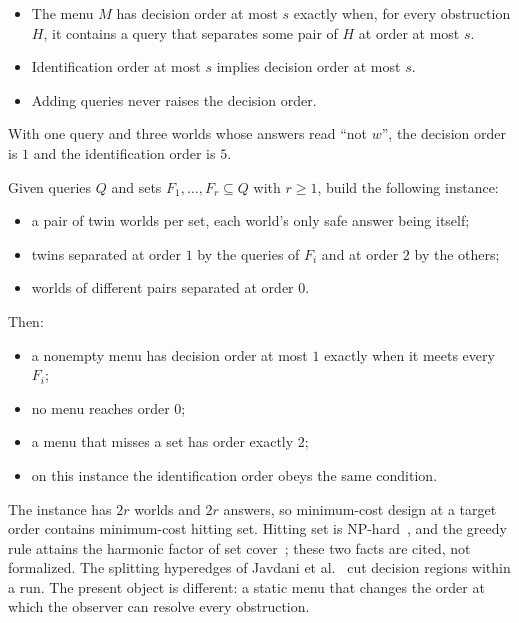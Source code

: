 \begin{theorem}
\label{thm:hitting}
\begin{itemize}
\item The menu $M$ has decision order at most $s$ exactly when, for every obstruction $H$, it
contains a query that separates some pair of $H$ at order at most $s$.
\item Identification order at most $s$ implies decision order at most $s$.
\item Adding queries never raises the decision order.
\end{itemize}
With one query and three worlds whose answers read ``not $w$'', the decision order is $1$ and
the identification order is $5$.
\end{theorem}

\begin{theorem}
\label{thm:hittingembed}
Given queries $Q$ and sets $F_1,\dots,F_r\subseteq Q$ with $r\ge1$, build the following
instance:
\begin{itemize}
\item a pair of twin worlds per set, each world's only safe answer being itself;
\item twins separated at order $1$ by the queries of $F_i$ and at order $2$ by the others;
\item worlds of different pairs separated at order $0$.
\end{itemize}
Then:
\begin{itemize}
\item a nonempty menu has decision order at most $1$ exactly when it meets every $F_i$;
\item no menu reaches order $0$;
\item a menu that misses a set has order exactly $2$;
\item on this instance the identification order obeys the same condition.
\end{itemize}
\end{theorem}

The instance has $2r$ worlds and $2r$ answers, so minimum-cost design at a target order contains
minimum-cost hitting set. Hitting set is NP-hard~\cite{karp1972}, and the greedy rule attains
the harmonic factor of set cover~\cite{johnson1974,chvatal1979}; these two facts are cited, not
formalized. The splitting hyperedges of Javdani et al.~\cite{javdani2014} cut decision regions
within a run. The present object is different: a static menu that changes the order at which
the observer can resolve every obstruction.

